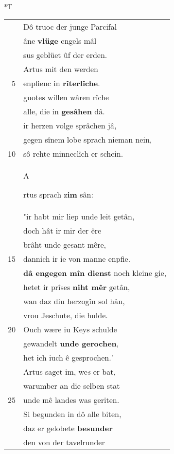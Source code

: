 \documentclass[8pt,a4paper,notitlepage]{article}
\begin{document}
\begin{table}[ht]
\begin{minipage}[t]{0.5\linewidth}
\end{minipage}
\hspace{0.5cm}
\begin{minipage}[t]{0.5\linewidth}
\small
\begin{center}*T
\end{center}
\begin{tabular}{rl}
 & Dô truoc der junge Parcifal\\ 
 & âne \textbf{vlüge} engels mâl\\ 
 & sus geblüet ûf der erden.\\ 
 & Artus mit den werden\\ 
5 & enpfienc in \textbf{rîterlîche}.\\ 
 & guotes willen wâren rîche\\ 
 & alle, die in \textbf{gesâhen} dâ.\\ 
 & ir herzen volge sprâchen jâ,\\ 
 & gegen sînem lobe sprach nieman nein,\\ 
10 & sô rehte minneclîch er schein.\\ 
 & \begin{large}A\end{large}rtus sprach z\textbf{im} sân:\\ 
 & "ir habt mir liep unde leit getân,\\ 
 & doch hât ir mir der êre\\ 
 & brâht unde gesant mêre,\\ 
15 & dannich ir ie von manne enpfie.\\ 
 & \textbf{dâ engegen mîn dienst} noch kleine gie,\\ 
 & hetet ir prîses \textbf{niht mêr} getân,\\ 
 & wan daz diu herzogîn sol hân,\\ 
 & vrou Jeschute, die hulde.\\ 
20 & Ouch wære iu Keys schulde\\ 
 & gewandelt \textbf{unde gerochen},\\ 
 & het ich iuch ê gesprochen."\\ 
 & Artus saget im, we\textit{s} er bat,\\ 
 & warumber an die selben stat\\ 
25 & unde mê landes was geriten.\\ 
 & Si begunden in dô alle biten,\\ 
 & daz er gelobete \textbf{besunder}\\ 
 & den von der tavelrunder\\ 

\end{tabular}
\end{minipage}
\end{table}
\end{document}
